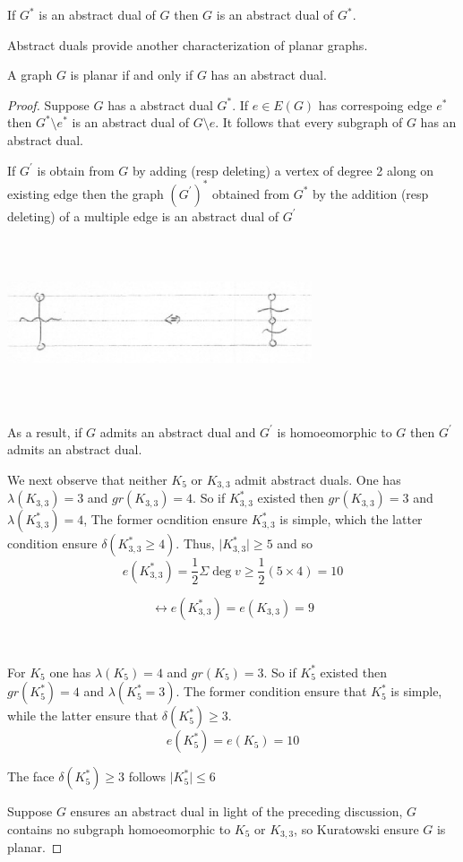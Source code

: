 \documentclass[12pt]{article}
\newenvironment{theorem}[1]{%
  \renewcommand\themanualtheoreminner{#1}%
  \manualtheoreminner
}{\endmanualtheoreminner}
\begin{document}
\begin{theorem}{14}
	If $G^{*}$ is an abstract dual of $G$ then $G$ is an abstract dual of $G^{*}$.

	Abstract duals provide another characterization of planar graphs.
\end{theorem}

\begin{theorem}{15}
	A graph $G$ is planar if and only if $G$ has an abstract dual.
\end{theorem}


\begin{proof}

	Suppose $G$ has a abstract dual $G^{*}$. If $e\in E(G)$ has correspoing edge $e^{*}$ then $G^{*}\setminus e^{*}$ is an abstract dual of $G\setminus e$.
	It follows that every subgraph of $G$ has an abstract dual.

	If $G^{'}$ is obtain from $G$ by adding (resp deleting) a vertex of degree 2 along on existing edge then the graph $(G^{'})^{*}$ obtained from $G^{*}$ by the addition (resp deleting) of a multiple edge is an abstract dual of $G^{'}$
	\begin{center}
		\includegraphics[width=9cm, height=5cm]{lastproof}
	\end{center}

	As a result, if $G$ admits an abstract dual and $G^{'}$ is homoeomorphic to $G$ then $G^{'}$ admits an abstract dual.

	We next observe that neither $K_{5}$ or $K_{3,3}$ admit abstract duals. One has $\lambda(K_{3,3}) = 3$ and $gr(K_{3,3}) = 4$. So if $K_{3,3}^{*}$ existed then $gr(K_{3,3}) = 3$ and $\lambda(K_{3,3}^{*}) = 4$,
	The former ocndition ensure $K_{3,3}^{*}$ is simple, which the latter condition ensure $\delta(K_{3,3}^{*}\ge 4)$.
	Thus, $\vert K_{3,3}^{*} \vert \ge 5$ and so
	\[e(K_{3,3}^{*}) = \frac{1}{2} \Sigma \deg v \ge \frac{1}{2}(5\times 4) = 10\]

	\[\leftrightarrow e(K_{3,3}^{*}) = e(K_{3,3}) = 9\]

	\

	For $K_{5}$ one has $\lambda(K_{5}) = 4$ and $gr(K_{5}) = 3$. So if $K_{5}^{*}$ existed then $gr(K_{5}^{*}) = 4$ and $\lambda(K_{5}^{*}=3)$.
	The former condition ensure that $K_{5}^{*}$ is simple, while the latter ensure that $\delta(K_{5}^{*})\ge 3$.
	\[e(K_{5}^{*}) = e(K_{5}) = 10\]

	The face $\delta(K_{5}^{*})\ge 3$ follows $\vert K_{5}^{*}\vert \le 6$


	Suppose $G$ ensures an abstract dual in light of the preceding discussion, $G$ contains no subgraph homoeomorphic to $K_{5}$ or $K_{3,3}$, so Kuratowski ensure $G$ is planar.


\end{proof}
\end{document}
